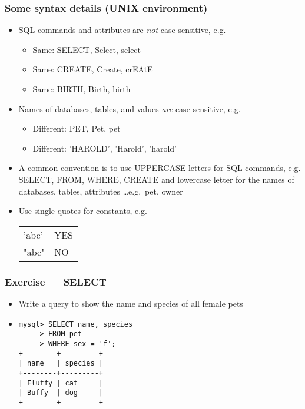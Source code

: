 \documentclass[hyperref={pdfpagelabels=false},svgnames,xcolor=table]{beamer}
\begin{document}
\begin{frame}
  \frametitle{Some syntax details (UNIX environment)}
  \begin{itemize}
    \item SQL commands and attributes are \emph{not} case-sensitive, e.g.\ 
      \begin{itemize}
        \item Same: SELECT, Select, select
        \item Same: CREATE, Create, crEAtE
        \item Same: BIRTH, Birth, birth
      \end{itemize}
    \item Names of databases, tables, and values \emph{are} case-sensitive, 
      e.g.\ 
      \begin{itemize}
        \item Different: PET, Pet, pet
        \item Different: 'HAROLD', 'Harold', 'harold'
      \end{itemize}
    \item A common convention is to use UPPERCASE letters for SQL commands,
      e.g. SELECT, FROM, WHERE, CREATE and lowercase letter for the names
      of databases, tables, attributes \ldots e.g.\ pet, owner
    \item Use single quotes for constants, e.g.\ \\
      \begin{tabular}{ll}
        'abc' & YES \\
        "abc" & NO
      \end{tabular}
  \end{itemize}
\end{frame}

\begin{frame}[fragile]
  \frametitle{Exercise --- SELECT}
  \begin{itemize}
    \item Write a query to show the name and species of all female pets
    \item<2-> 
\begin{verbatim}
mysql> SELECT name, species
    -> FROM pet
    -> WHERE sex = 'f';
+--------+---------+
| name   | species |
+--------+---------+
| Fluffy | cat     |
| Buffy  | dog     |
+--------+---------+
\end{verbatim}
  \end{itemize}
\end{frame}
\end{document}
